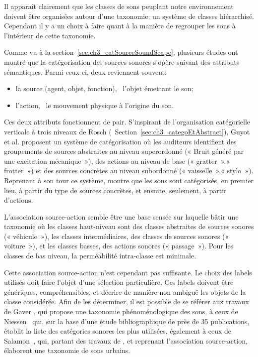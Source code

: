 Il apparaît clairement que les classes de sons peuplant notre environnement doivent être organisées autour d'une taxonomie: un système de classes hiérarchisé. Cependant il y a un choix à faire quant à la manière de regrouper les sons à l'intérieur de cette taxonomie.

Comme vu à la section~\ref{sec:ch3_catSourceSoundScape}, plusieurs études ont montré que la catégorisation des sources sonores s'opère suivant des attributs sémantiques. Parmi ceux-ci, deux reviennent souvent:

\begin{itemize}
\item la source (agent, objet, fonction), \ie~l'objet émettant le son;
\item l'action, \ie~le mouvement physique à l'origine du son.
\end{itemize} 

Ces deux attributs fonctionnent de pair. S'inspirant de l'organisation catégorielle verticale à trois niveaux de Rosch (\cf~Section~\ref{sec:ch3_categoEtAbstract}), Guyot et al. \citep{guyot1997} proposent un système de catégorisation où les auditeurs identifient des groupements de sources abstraites au niveau superordonné (« Bruit généré par une excitation mécanique~»), des actions au niveau de base (« gratter~»,« frotter~») et des sources concrètes au niveau subordonné (« vaisselle~»,« stylo~»). Reprenant à son tour ce système, \citep{houix_lexical_2012} montre que les sons sont catégorisés, en premier lieu, à partir du type de sources concrètes, et ensuite, seulement, à partir d'actions.

L'association source-action semble être une base sensée sur laquelle bâtir une taxonomie où les classes haut-niveau sont des classes abstraites de sources sonores (« véhicule~»), les classes intermédiaires, des classes de sources sonores (« voiture~»), et les classes basses, des actions sonores (« passage~»). Pour les classes de bas niveau, la perméabilité intra-classe est minimale.

Cette association source-action n'est cependant pas suffisante. Le choix des labels utilisés doit faire l'objet d'une sélection particulière. Ces labels doivent être génériques, compréhensibles, et décrire de manière non ambiguë les objets de la classe considérée. Afin de les déterminer, il est possible de se référer aux travaux de Gaver \citep{gaver1993world}, qui propose une taxonomie phénoménologique des sons, à ceux de Niessen~\al \citep{niessen2010categories} qui, sur la base d'une étude bibliographique de près de 35 publications, établit la liste des catégories sonores les plus utilisées, également à ceux de Salamon~\al \citep{Salamon14}, qui, partant des travaux de \citep{brown2011towards}, et reprenant l'association source-action, élaborent une taxonomie de sons urbains.

